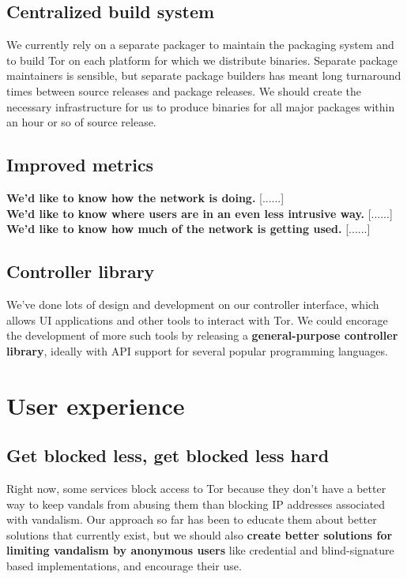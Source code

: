 \documentclass{article}
\newcommand{\tmp}[1]{{\bf #1} [......] \\}
\begin{document}
\subsection{Centralized build system}
We currently rely on a separate packager to maintain the packaging system and
to build Tor on each platform for which we distribute binaries.  Separate
package maintainers is sensible, but separate package builders has meant
long turnaround times between source releases and package releases.  We
should create the necessary infrastructure for us to produce binaries for all
major packages within an hour or so of source release.

\subsection{Improved metrics}
\tmp{We'd like to know how the network is doing.}

\tmp{We'd like to know where users are in an even less intrusive way.}

\tmp{We'd like to know how much of the network is getting used.}

\subsection{Controller library}
We've done lots of design and development on our controller interface, which
allows UI applications and other tools to interact with Tor.  We could
encorage the development of more such tools by releasing a {\bf
  general-purpose controller library}, ideally with API support for several
popular programming languages.

\section{User experience}

\subsection{Get blocked less, get blocked less hard}
Right now, some services block access to Tor because they don't have a better
way to keep vandals from abusing them than blocking IP addresses associated
with vandalism.  Our approach so far has been to educate them about better
solutions that currently exist, but we should also {\bf create better
solutions for limiting vandalism by anonymous users} like credential and
blind-signature based implementations, and encourage their use.
\end{document}
